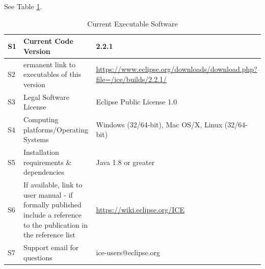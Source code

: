 See Table \ref{execTable}.

\begin{table}[!htbp]
\begin{tabularx}{\textwidth}{|l|X|X|}
\hline
S1 & Current Code Version & 2.2.1 \tabularnewline\hline
S2 & ermanent link to executables of this version &
\url{https://www.eclipse.org/downloads/download.php?file=/ice/builds/2.2.1/}
 \tabularnewline\hline 
S3 & Legal Software License & Eclipse Public License 1.0 \tabularnewline\hline
S4 & Computing platforms/Operating Systems & Windows (32/64-bit), Mac OS/X,
Linux (32/64-bit) \tabularnewline\hline 
S5 & Installation requirements \& dependencies & Java 1.8 or
greater \tabularnewline\hline
S6 & If available, link to user manual - if formally published include a
reference to the publication in the reference list &
\url{https://wiki.eclipse.org/ICE} \tabularnewline\hline 
S7 & Support email for questions & ice-users@eclipse.org \tabularnewline\hline
\end{tabularx}
\caption{Current Executable Software}
\label{execTable}
\end{table}